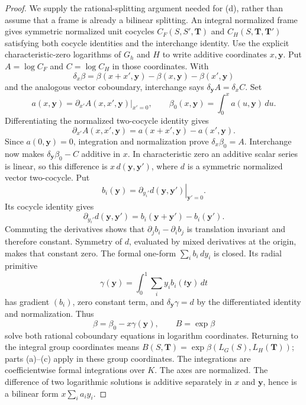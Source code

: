 \documentclass[11pt,a4paper]{article}
\theoremstyle{definition}\newtheorem{remark}[theorem]{Remark}
\begin{document}
\begin{proof}
We supply the rational-splitting argument needed for (d), rather than assume that a frame is already a bilinear splitting. An integral normalized frame gives symmetric normalized unit cocycles $C_F(S,S',\mathbf T)$ and $C_H(S,\mathbf T,\mathbf T')$ satisfying both cocycle identities and the interchange identity. Use the explicit characteristic-zero logarithms of $G_h$ and $H$ to write additive coordinates $x,\mathbf y$. Put $A=\log C_F$ and $C=\log C_H$ in those coordinates. With
\[
 \delta_x\beta=\beta(x+x',\mathbf y)-\beta(x,\mathbf y)-\beta(x',\mathbf y)
\]
and the analogous vector coboundary, interchange says $\delta_{\mathbf y}A=\delta_x C$.
Set
\[
 a(x,\mathbf y)=\left.\partial_{x'}A(x,x',\mathbf y)\right|_{x'=0},\qquad
 \beta_0(x,\mathbf y)=\int_0^x a(u,\mathbf y)\,du.
\]
Differentiating the normalized two-cocycle identity gives
\[
 \partial_{x'}A(x,x',\mathbf y)=a(x+x',\mathbf y)-a(x',\mathbf y).
\]
Since $a(0,\mathbf y)=0$, integration and normalization prove $\delta_x\beta_0=A$. Interchange now makes $\delta_{\mathbf y}\beta_0-C$ additive in $x$. In characteristic zero an additive scalar series is linear, so this difference is $x\,d(\mathbf y,\mathbf y')$, where $d$ is a symmetric normalized vector two-cocycle. Put
\[
 b_i(\mathbf y)=\left.\partial_{y_i'}d(\mathbf y,\mathbf y')\right|_{\mathbf y'=0}.
\]
Its cocycle identity gives
\[
 \partial_{y_i'}d(\mathbf y,\mathbf y')=b_i(\mathbf y+\mathbf y')-b_i(\mathbf y').
\]
Commuting the derivatives shows that $\partial_jb_i-\partial_i b_j$ is translation invariant and therefore constant. Symmetry of $d$, evaluated by mixed derivatives at the origin, makes that constant zero. The formal one-form $\sum_i b_i\,dy_i$ is closed. Its radial primitive
\[
 \gamma(\mathbf y)=\int_0^1\sum_i y_i b_i(t\mathbf y)\,dt
\]
has gradient $(b_i)$, zero constant term, and $\delta_{\mathbf y}\gamma=d$ by the differentiated identity and normalization. Thus
\[
 \beta=\beta_0-x\gamma(\mathbf y),\qquad B=\exp\beta
\]
solve both rational coboundary equations in logarithm coordinates. Returning to the integral group coordinates means $B(S,\mathbf T)=\exp\beta(L_G(S),L_H(\mathbf T))$; parts (a)--(c) apply in these group coordinates. The integrations are coefficientwise formal integrations over $K$. The axes are normalized. The difference of two logarithmic solutions is additive separately in $x$ and $\mathbf y$, hence is a bilinear form $x\sum_i a_i y_i$.


\end{proof}
\end{document}
